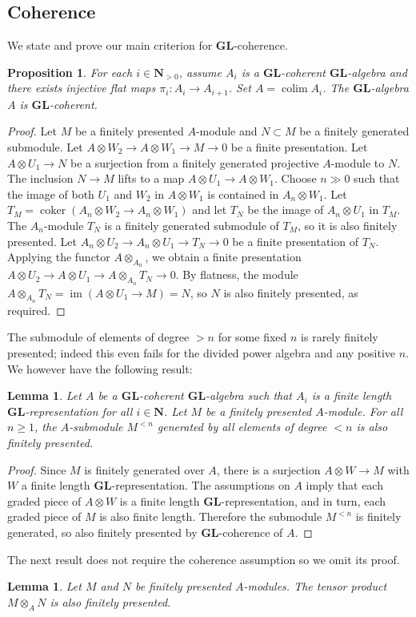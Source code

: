 \documentclass[12pt]{amsart}
\newcommand{\bN}{\mathbf{N}}
\DeclareMathOperator{\im}{im}
\DeclareMathOperator{\coker}{coker}
\DeclareMathOperator{\colim}{colim}
\newcommand{\GL}{\mathbf{GL}}
\numberwithin{equation}{section}
\newtheorem{proposition}[equation]{Proposition}
\newtheorem{lemma}[equation]{Lemma}
\theoremstyle{definition}
\theoremstyle{plain}
\begin{document}
\subsection{Coherence} \label{ss:coherence}
We state and prove our main criterion for $\GL$-coherence.
\begin{proposition}\label{prop:coherenceofflat}
For each $i \in \mathbf{N}_{>0}$, assume $A_i$ is a $\GL$-coherent $\GL$-algebra and there exists injective flat maps $\pi_i \colon A_i \to A_{i+1}$. Set $A = \colim A_i$.
The $\GL$-algebra $A$ is $\GL$-coherent.
\end{proposition}
\begin{proof}
Let $M$ be a finitely presented $A$-module and $N \subset M$ be a finitely generated submodule. Let $A \otimes W_2 \to A \otimes W_1 \to M \to 0$ be a finite presentation. Let $A \otimes U_1 \to N$ be a surjection from a finitely generated projective $A$-module to $N$. The inclusion $N \to M$ lifts to a map $A \otimes U_1 \to A \otimes W_1$. Choose $n \gg 0$ such that the image of both $U_1$ and $W_2$ in $A \otimes W_1$ is contained in $A_n \otimes W_1$. Let $T_M = \coker(A_n \otimes W_2 \to A_n \otimes W_1)$ and let $T_N$ be the image of $A_n \otimes U_1$ in $T_M$. The $A_n$-module $T_N$ is a finitely generated submodule of $T_M$, so it is also finitely presented. Let $A_n \otimes U_2 \to A_n \otimes U_1 \to T_N \to 0$ be a finite presentation of $T_N$. Applying the functor $A \otimes_{A_n}$, we obtain a finite presentation $A \otimes U_2 \to A \otimes U_1 \to A \otimes_{A_n} T_N \to 0$. By flatness, the module $A \otimes_{A_n} T_N = \im(A \otimes U_1 \to M) = N$, so $N$ is also finitely presented, as required.
\end{proof}

The submodule of elements of degree $> n$ for some fixed $n$ is rarely finitely presented; indeed this even fails for the divided power algebra and any positive $n$. We however have the following result:
\begin{lemma}
Let $A$ be a $\GL$-coherent $\GL$-algebra such that $A_i$ is a finite length $\GL$-representation for all $i \in \bN$. Let $M$ be a finitely presented $A$-module. For all $n \geq 1$, the $A$-submodule $M^{< n}$ generated by all elements of degree $< n$ is also finitely presented.
\end{lemma}
\begin{proof}
Since $M$ is finitely generated over $A$, there is a surjection $A \otimes W \to M$ with $W$ a finite length $\GL$-representation. The assumptions on $A$ imply that each graded piece of $A\otimes W$ is a finite length $\GL$-representation, and in turn, each graded piece of $M$ is also finite length. Therefore the submodule $M^{<n}$ is finitely generated, so also finitely presented by $\GL$-coherence of $A$.
\end{proof}
The next result does not require the coherence assumption so we omit its proof.
\begin{lemma}\label{lem:tensorfp}
    Let $M$ and $N$ be finitely presented $A$-modules. The tensor product $M \otimes_A N$ is also finitely presented.
\end{lemma}
\end{document}
